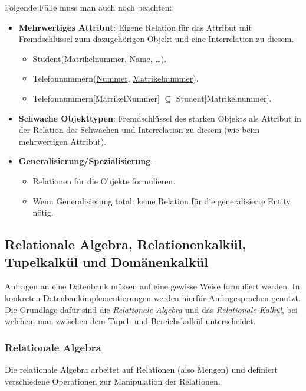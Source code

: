\documentclass[a4paper,parskip=half*,DIV=15,fontsize=11pt]{scrartcl}
\begin{document}
Folgende Fälle muss man auch noch beachten:
\begin{itemize}
  \item \textbf{Mehrwertiges Attribut}: Eigene Relation für das Attribut mit Fremdschlüssel zum dazugehörigen Objekt und eine Interrelation zu diesem.
    \begin{itemize}
      \item Student(\underline{Matrikelnummer}, Name, \ldots).
      \item Telefonnummern(\underline {Nummer}, \underline{Matrikelnummer}).
      \item Telefonnummern[MatrikelNummer] $\subseteq$ Student[Matrikelnummer].
    \end{itemize}
  \item \textbf{Schwache Objekttypen}: Fremdschlüssel des starken Objekts als Attribut in der Relation des Schwachen und Interrelation zu diesem (wie beim mehrwertigen Attribut).
  \item \textbf{Generalisierung/Spezialisierung}:
    \begin{itemize}
      \item Relationen für die Objekte formulieren.
      \item Wenn Generalisierung total: keine Relation für die generalisierte Entity nötig.
  \end{itemize}
\end{itemize}

\subsection{Relationale Algebra, Relationenkalkül, Tupelkalkül und Domänenkalkül}
Anfragen an eine Datenbank müssen auf eine gewisse Weise formuliert werden. In konkreten Datenbankimplementierungen werden hierfür Anfragesprachen genutzt. Die Grundlage dafür sind die \textit{Relationale Algebra} und das \textit{Relationale Kalkül}, bei welchem man zwischen dem Tupel- und Bereichskalkül unterscheidet.

\subsubsection{Relationale Algebra}
Die relationale Algebra arbeitet auf Relationen (also Mengen) und definiert verschiedene Operationen zur Manipulation der Relationen.
\end{document}
